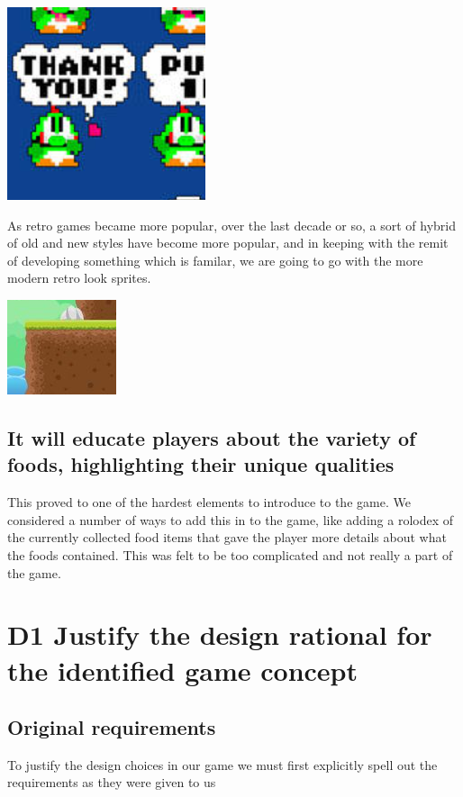 \documentclass{article}
\begin{document}
\includegraphics[scale=0.5]{TraditionalSprite}

As retro games became more popular, over the last decade or so, a sort of hybrid of old and new styles have become more popular, and in keeping with the remit of developing something which is familar, we are going to go with the more modern retro look sprites.

\includegraphics[scale=0.5]{SoftSprite}


\subsection{ It will educate players about the variety of foods, highlighting their unique qualities }
This proved to one of the hardest elements to introduce to the game. We considered a number of ways to add this in to the game, like adding a rolodex of the currently collected food items that gave the player more details about what the foods contained. This was felt to be too complicated and not really a part of the game.

\section{D1 Justify the design rational for the identified game concept}


\subsection{Original requirements}
To justify the design choices in our game we must first explicitly spell out the requirements as they were given to us
\end{document}
